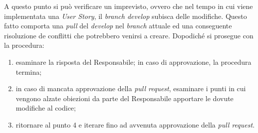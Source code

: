 A questo punto si può verificare un imprevisto, ovvero che nel tempo in cui viene implementata una \emph{User Story}, il \emph{branch develop} subisca delle modifiche. Questo fatto comporta una \emph{pull} del \emph{develop} nel \emph{branch} attuale ed una conseguente risoluzione de conflitti che potrebbero venirsi a creare. Dopodiché si prosegue con la procedura:
\begin{enumerate}[resume]
	\item esaminare la risposta del Responsabile; in caso di approvazione, la procedura termina;
	\item in caso di mancata approvazione della \emph{pull request}, esaminare i punti in cui vengono alzate obiezioni da parte del Responsabile apportare le dovute modifiche al codice;
	\item ritornare al punto 4 e iterare fino ad avvenuta approvazione della \emph{pull request}.
\end{enumerate}


